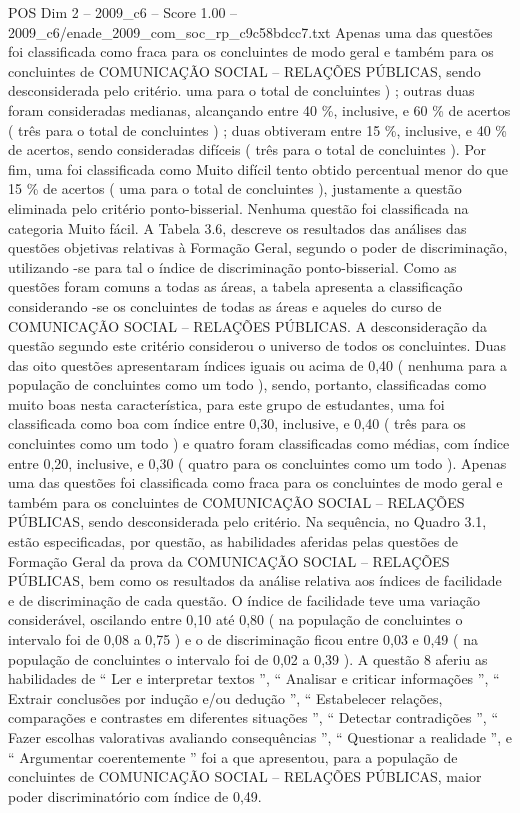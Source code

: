 \begin{textsample}{POS Dim 2 – 2009\_c6 – Score 1.00 – 2009\_c6/enade\_2009\_com\_soc\_rp\_c9c58bdcc7.txt}
Apenas uma das questões foi classificada como fraca para os concluintes de modo geral e também para os concluintes de COMUNICAÇÃO SOCIAL – RELAÇÕES PÚBLICAS, sendo desconsiderada pelo critério. uma para o total de concluintes ) ; outras duas foram consideradas medianas, alcançando entre 40 \%, inclusive, e 60 \% de acertos ( três para o total de concluintes ) ; duas obtiveram entre 15 \%, inclusive, e 40 \% de acertos, sendo consideradas difíceis ( três para o total de concluintes ).
Por fim, uma foi classificada como Muito difícil tento obtido percentual menor do que 15 \% de acertos ( uma para o total de concluintes ), justamente a questão eliminada pelo critério ponto-bisserial.
Nenhuma questão foi classificada na categoria Muito fácil.
A Tabela 3.6, descreve os resultados das análises das questões objetivas relativas à Formação Geral, segundo o poder de discriminação, utilizando -se para tal o índice de discriminação ponto-bisserial.
Como as questões foram comuns a todas as áreas, a tabela apresenta a classificação considerando -se os concluintes de todas as áreas e aqueles do curso de COMUNICAÇÃO SOCIAL – RELAÇÕES PÚBLICAS.
A desconsideração da questão segundo este critério considerou o universo de todos os concluintes.
Duas das oito questões apresentaram índices iguais ou acima de 0,40 ( nenhuma para a população de concluintes como um todo ), sendo, portanto, classificadas como muito boas nesta característica, para este grupo de estudantes, uma foi classificada como boa com índice entre 0,30, inclusive, e 0,40 ( três para os concluintes como um todo ) e quatro foram classificadas como médias, com índice entre 0,20, inclusive, e 0,30 ( quatro para os concluintes como um todo ).
Apenas uma das questões foi classificada como fraca para os concluintes de modo geral e também para os concluintes de COMUNICAÇÃO SOCIAL – RELAÇÕES PÚBLICAS, sendo desconsiderada pelo critério.
Na sequência, no Quadro 3.1, estão especificadas, por questão, as habilidades aferidas pelas questões de Formação Geral da prova da COMUNICAÇÃO SOCIAL – RELAÇÕES PÚBLICAS, bem como os resultados da análise relativa aos índices de facilidade e de discriminação de cada questão.
O índice de facilidade teve uma variação considerável, oscilando entre 0,10 até 0,80 ( na população de concluintes o intervalo foi de 0,08 a 0,75 ) e o de discriminação ficou entre 0,03 e 0,49 ( na população de concluintes o intervalo foi de 0,02 a 0,39 ).
A questão 8 aferiu as habilidades de “ Ler e interpretar textos ”, “ Analisar e criticar informações ”, “ Extrair conclusões por indução e/ou dedução ”, “ Estabelecer relações, comparações e contrastes em diferentes situações ”, “ Detectar contradições ”, “ Fazer escolhas valorativas avaliando consequências ”, “ Questionar a realidade ”, e “ Argumentar coerentemente ” foi a que apresentou, para a população de concluintes de COMUNICAÇÃO SOCIAL – RELAÇÕES PÚBLICAS, maior poder discriminatório com índice de 0,49.

\end{textsample}
